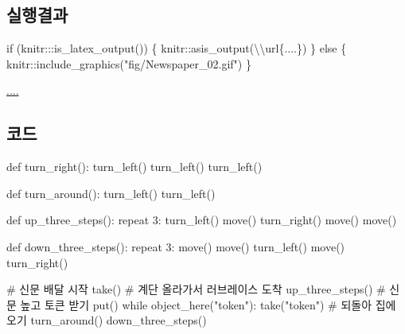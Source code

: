 \documentclass[
  b5paperpaper,
  DIV=11,
  numbers=noendperiod]{scrreprt}
\newenvironment{Shaded}{\begin{snugshade}}{\end{snugshade}}
\newcommand{\CommentTok}[1]{\textcolor[rgb]{0.37,0.37,0.37}{#1}}
\newcommand{\ControlFlowTok}[1]{\textcolor[rgb]{0.00,0.23,0.31}{#1}}
\newcommand{\DecValTok}[1]{\textcolor[rgb]{0.68,0.00,0.00}{#1}}
\newcommand{\FunctionTok}[1]{\textcolor[rgb]{0.28,0.35,0.67}{#1}}
\newcommand{\KeywordTok}[1]{\textcolor[rgb]{0.00,0.23,0.31}{#1}}
\newcommand{\NormalTok}[1]{\textcolor[rgb]{0.00,0.23,0.31}{#1}}
\newcommand{\SpecialCharTok}[1]{\textcolor[rgb]{0.37,0.37,0.37}{#1}}
\newcommand{\StringTok}[1]{\textcolor[rgb]{0.13,0.47,0.30}{#1}}
\begin{document}
\hypertarget{uxc2e4uxd589uxacb0uxacfc-10}{%
\subsection{실행결과}\label{uxc2e4uxd589uxacb0uxacfc-10}}

\begin{Shaded}
\begin{Highlighting}[]
\ControlFlowTok{if}\NormalTok{ (knitr}\SpecialCharTok{:::}\FunctionTok{is\_latex\_output}\NormalTok{()) \{}
\NormalTok{  knitr}\SpecialCharTok{::}\FunctionTok{asis\_output}\NormalTok{(}\StringTok{\textquotesingle{}}\SpecialCharTok{\textbackslash{}\textbackslash{}}\StringTok{url\{....\}\textquotesingle{}}\NormalTok{)}
\NormalTok{\} }\ControlFlowTok{else}\NormalTok{ \{}
\NormalTok{  knitr}\SpecialCharTok{::}\FunctionTok{include\_graphics}\NormalTok{(}\StringTok{"fig/Newspaper\_02.gif"}\NormalTok{)}
\NormalTok{\}}
\end{Highlighting}
\end{Shaded}

\url{....}

\hypertarget{uxcf54uxb4dc-10}{%
\subsection{코드}\label{uxcf54uxb4dc-10}}

\begin{Shaded}
\begin{Highlighting}[]
\KeywordTok{def}\NormalTok{ turn\_right():}
\NormalTok{    turn\_left()}
\NormalTok{    turn\_left()}
\NormalTok{    turn\_left()}

\KeywordTok{def}\NormalTok{ turn\_around():}
\NormalTok{    turn\_left()}
\NormalTok{    turn\_left()}

\KeywordTok{def}\NormalTok{ up\_three\_steps():}
\NormalTok{    repeat }\DecValTok{3}\NormalTok{:}
\NormalTok{        turn\_left()}
\NormalTok{        move()}
\NormalTok{        turn\_right()}
\NormalTok{        move()}
\NormalTok{        move()}

\KeywordTok{def}\NormalTok{ down\_three\_steps():}
\NormalTok{    repeat }\DecValTok{3}\NormalTok{:}
\NormalTok{        move()}
\NormalTok{        move()}
\NormalTok{        turn\_left()}
\NormalTok{        move()}
\NormalTok{        turn\_right()}

\CommentTok{\# 신문 배달 시작}
\NormalTok{take()}
\CommentTok{\# 계단 올라가서 러브레이스 도착}
\NormalTok{up\_three\_steps()}
\CommentTok{\# 신문 높고 토큰 받기}
\NormalTok{put()}
\ControlFlowTok{while}\NormalTok{ object\_here(}\StringTok{"token"}\NormalTok{):}
\NormalTok{    take(}\StringTok{"token"}\NormalTok{)}
\CommentTok{\# 되돌아 집에 오기    }
\NormalTok{turn\_around()}
\NormalTok{down\_three\_steps()}
\end{Highlighting}
\end{Shaded}
\end{document}
